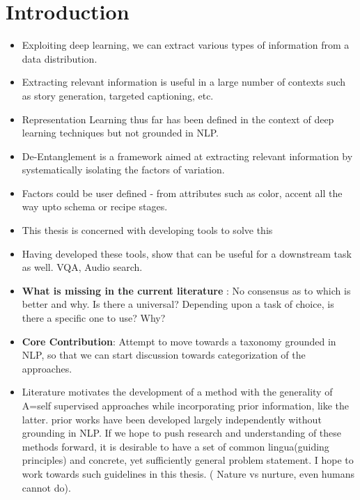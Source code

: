 \chapter{Introduction}

\iffalse

-  Illustrative Example Scenarios
-  Technical Challenges
-  Core Contributions
-  Other Contributions
-  What isnt the thesis dealing with?

\fi
\begin{itemize}
    \item  Exploiting deep learning, we can extract various types of information from a data distribution.
    \item Extracting relevant information is useful in a large number of contexts such as story generation, targeted captioning, etc. 
    \item Representation Learning thus far has been defined in the context of deep learning techniques but not grounded in NLP. 
    \item De-Entanglement is a framework aimed at extracting relevant information by systematically isolating the factors of variation. 
    \item Factors could be user defined - from attributes such as color, accent all the way upto schema or recipe stages.
    \item This thesis is concerned with developing tools to solve this 
    \item Having developed these tools, show  that can be useful for a downstream task as well. VQA, Audio search.

    
\end{itemize}

\begin{itemize}
    \item \textbf{What is missing in the current literature} : No consensus as to which is better and why. Is there a universal? Depending upon a task of choice, is there a specific one to use? Why?
    
    \item \textbf{Core Contribution}: Attempt to move towards a taxonomy grounded in NLP, so that we can start discussion towards categorization of the approaches. 
    
    \item Literature motivates the development of a method with the generality of A=self supervised approaches while incorporating prior information, like the latter. prior works have been developed largely independently without grounding in NLP. If we hope to push research and understanding of these methods forward, it is desirable to have a set of common lingua(guiding principles) and concrete, yet sufficiently general problem statement. I hope to work towards such guidelines in this thesis. ( Nature vs nurture, even humans cannot do). 
    
    
\end{itemize}

